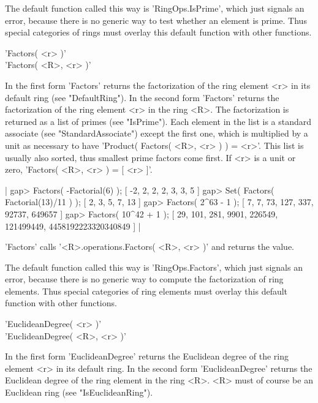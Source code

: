 The  default function called this way is  'RingOps.IsPrime',  which  just
signals an error,  because there is no generic  way  to test  whether  an
element is  prime.  Thus special  categories  of  rings must overlay this
default function with other functions.


'Factors( <r> )' \\
'Factors( <R>, <r> )'

In the first form 'Factors' returns the factorization of the ring element
<r>  in  its default  ring  (see   "DefaultRing").   In the  second  form
'Factors' returns the factorization of the ring element  <r> in  the ring
<R>.  The factorization is returned as a list of primes  (see "IsPrime").
Each  element   in   the  list     is    a   standard    associate   (see
"StandardAssociate") except the first one,  which is multiplied by a unit
as necessary to have 'Product( Factors( <R>, <r> )  )  = <r>'.  This list
is usually also sorted, thus smallest prime factors come  first.   If <r>
is a unit or zero, 'Factors( <R>, <r> ) = [ <r> ]'.

|    gap> Factors( -Factorial(6) );
    [ -2, 2, 2, 2, 3, 3, 5 ]
    gap> Set( Factors( Factorial(13)/11 ) );
    [ 2, 3, 5, 7, 13 ]
    gap> Factors( 2^63 - 1 );
    [ 7, 7, 73, 127, 337, 92737, 649657 ]
    gap> Factors( 10^42 + 1 );
    [ 29, 101, 281, 9901, 226549, 121499449, 4458192223320340849 ] |

'Factors' calls  '<R>.operations.Factors(  <R>, <r>  )' and   returns the
value.

The  default function called  this way is   'RingOps.Factors', which just
signals an   error, because there    is no  generic  way to  compute  the
factorization of ring elements.  Thus special categories of ring elements
must overlay this default function with other functions.


'EuclideanDegree( <r> )' \\
'EuclideanDegree( <R>, <r> )'

In the first form 'EuclideanDegree'  returns the Euclidean degree of  the
ring  element  <r>     in  its    default  ring.  In    the   second form
'EuclideanDegree' returns the Euclidean degree of the ring element in the
ring    <R>.    <R>   must   of course  be    an    Euclidean  ring  (see
"IsEuclideanRing").

